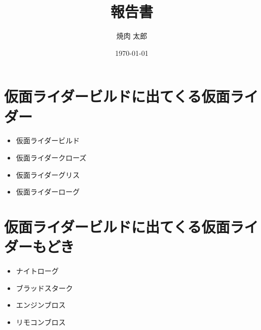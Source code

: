 \documentclass[uplatex]{jsarticle}
\begin{document}
\title{\huge 報告書}
\author{焼肉 太郎}
\date{\today}
\maketitle

\section{仮面ライダービルドに出てくる仮面ライダー}
    \begin{itemize}
        \item 仮面ライダービルド
        \item 仮面ライダークローズ
        \item 仮面ライダーグリス
        \item 仮面ライダーローグ
    \end{itemize}

\section{仮面ライダービルドに出てくる仮面ライダーもどき}
    \begin{itemize}
        \item ナイトローグ
        \item ブラッドスターク
        \item エンジンブロス
        \item リモコンブロス
    \end{itemize}
\end{document}
